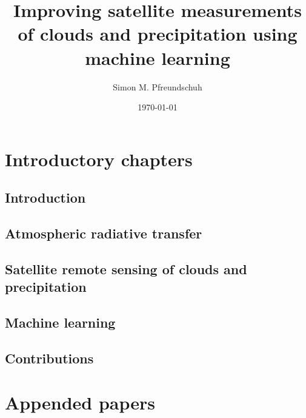 \documentclass[12pt, a4paper, twoside]{report}
\title{Improving satellite measurements of clouds and precipitation using machine learning}
\author{Simon M. Pfreundschuh}
\date{\today}
\begin{document}





\tableofcontents
\clearpage


\part{Introductory chapters}

\chapter{Introduction}


\chapter{Atmospheric radiative transfer}


\chapter{Satellite remote sensing of clouds and precipitation}


\chapter{Machine learning}


\chapter{Contributions}



 

\part{Appended papers}

\renewcommand{\chaptername}{Paper}
\setcounter{chapter}{0}
\end{document}

